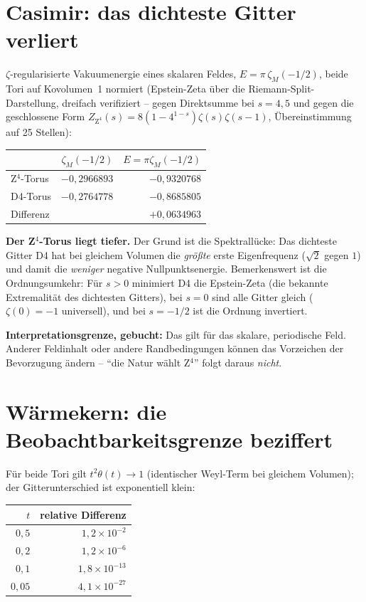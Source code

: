 \documentclass[11pt]{report}
\begin{document}
\section{Casimir: das dichteste Gitter verliert}

$\zeta$-regularisierte Vakuumenergie eines skalaren Feldes,
$E = \pi\,\zeta_M(-1/2)$, beide Tori auf Kovolumen~1 normiert
(Epstein-Zeta über die Riemann-Split-Darstellung, dreifach
verifiziert -- gegen Direktsumme bei $s = 4, 5$ und gegen die
geschlossene Form $Z_{\text{Z}^4}(s) = 8(1-4^{1-s})\zeta(s)\zeta(s-1)$,
Übereinstimmung auf 25 Stellen):

\begin{center}
\begin{tabular}{lrr}
\toprule
 & $\zeta_M(-1/2)$ & $E = \pi\zeta_M(-1/2)$ \\
\midrule
Z$^4$-Torus & $-0{,}2966893$ & $-0{,}9320768$ \\
D4-Torus & $-0{,}2764778$ & $-0{,}8685805$ \\
\midrule
Differenz & & $+0{,}0634963$ \\
\bottomrule
\end{tabular}
\end{center}

\textbf{Der Z$^4$-Torus liegt tiefer.} Der Grund ist die
Spektrallücke: Das dichteste Gitter D4 hat bei gleichem Volumen die
\emph{größte} erste Eigenfrequenz ($\sqrt2$ gegen $1$) und damit die
\emph{weniger} negative Nullpunktsenergie. Bemerkenswert ist die
Ordnungsumkehr: Für $s > 0$ minimiert D4 die Epstein-Zeta (die
bekannte Extremalität des dichtesten Gitters), bei $s = 0$ sind alle
Gitter gleich ($\zeta(0) = -1$ universell), und bei $s = -1/2$ ist
die Ordnung invertiert.

\textbf{Interpretationsgrenze, gebucht:} Das gilt für das skalare,
periodische Feld. Anderer Feldinhalt oder andere Randbedingungen
können das Vorzeichen der Bevorzugung ändern --
\enquote{die Natur wählt Z$^4$} folgt daraus \emph{nicht}.

\section{Wärmekern: die Beobachtbarkeitsgrenze beziffert}

Für beide Tori gilt $t^2\theta(t) \to 1$ (identischer Weyl-Term bei
gleichem Volumen); der Gitterunterschied ist exponentiell klein:

\begin{center}
\begin{tabular}{rr}
\toprule
$t$ & relative Differenz \\
\midrule
$0{,}5$ & $1{,}2\times10^{-2}$ \\
$0{,}2$ & $1{,}2\times10^{-6}$ \\
$0{,}1$ & $1{,}8\times10^{-13}$ \\
$0{,}05$ & $4{,}1\times10^{-27}$ \\
\bottomrule
\end{tabular}
\end{center}
\end{document}
